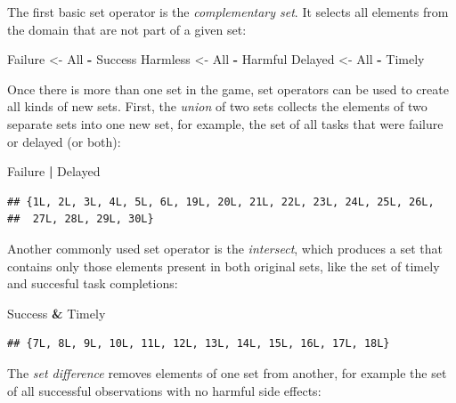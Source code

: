 \documentclass[]{svmono}
\newenvironment{Shaded}{\begin{snugshade}}{\end{snugshade}}
\newcommand{\StringTok}[1]{\textcolor[rgb]{0.31,0.60,0.02}{#1}}
\newcommand{\OperatorTok}[1]{\textcolor[rgb]{0.81,0.36,0.00}{\textbf{#1}}}
\newcommand{\NormalTok}[1]{#1}
\theoremstyle{definition}
\theoremstyle{definition}
\theoremstyle{definition}
\theoremstyle{remark}
\begin{document}
The first basic set operator is the \emph{complementary set}. It selects
all elements from the domain that are not part of a given set:

\begin{Shaded}
\begin{Highlighting}[]
\NormalTok{Failure  <-}\StringTok{ }\NormalTok{All }\OperatorTok{-}\StringTok{ }\NormalTok{Success}
\NormalTok{Harmless <-}\StringTok{ }\NormalTok{All }\OperatorTok{-}\StringTok{ }\NormalTok{Harmful}
\NormalTok{Delayed  <-}\StringTok{ }\NormalTok{All }\OperatorTok{-}\StringTok{ }\NormalTok{Timely}
\end{Highlighting}
\end{Shaded}

Once there is more than one set in the game, set operators can be used
to create all kinds of new sets. First, the \emph{union} of two sets
collects the elements of two separate sets into one new set, for
example, the set of all tasks that were failure or delayed (or both):

\begin{Shaded}
\begin{Highlighting}[]
\NormalTok{Failure }\OperatorTok{|}\StringTok{ }\NormalTok{Delayed}
\end{Highlighting}
\end{Shaded}

\begin{verbatim}
## {1L, 2L, 3L, 4L, 5L, 6L, 19L, 20L, 21L, 22L, 23L, 24L, 25L, 26L,
##  27L, 28L, 29L, 30L}
\end{verbatim}

Another commonly used set operator is the \emph{intersect}, which
produces a set that contains only those elements present in both
original sets, like the set of timely and succesful task completions:

\begin{Shaded}
\begin{Highlighting}[]
\NormalTok{Success }\OperatorTok{&}\StringTok{ }\NormalTok{Timely}
\end{Highlighting}
\end{Shaded}

\begin{verbatim}
## {7L, 8L, 9L, 10L, 11L, 12L, 13L, 14L, 15L, 16L, 17L, 18L}
\end{verbatim}

The \emph{set difference} removes elements of one set from another, for
example the set of all successful observations with no harmful side
effects:
\end{document}
